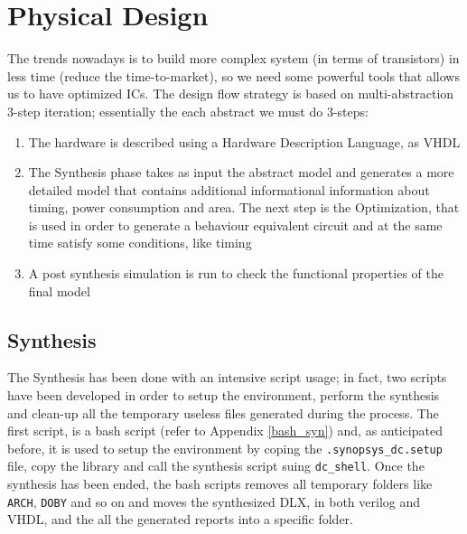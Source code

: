 \chapter{Physical Design}
The trends nowadays is to build more complex system (in terms of transistors) in less time (reduce the time-to-market), so we need some powerful tools that allows us to have optimized ICs. The design flow strategy is based on multi-abstraction 3-step iteration; essentially the each
abstract we must do 3-steps:
\begin{enumerate}
	\item The hardware is described using a Hardware Description Language, as VHDL
	\item The Synthesis phase takes as input the abstract model and generates a more detailed model that contains additional informational information about timing, power consumption and area. The next step is the Optimization, that is used in order to generate a behaviour equivalent circuit and at the same time satisfy some conditions, like timing
	\item A post synthesis simulation is run to check the functional properties of the final model
\end{enumerate}
\section{Synthesis}
\label{sec:syn_opt}
The Synthesis has been done with an intensive script usage; in fact, two scripts have been developed in order to setup the environment, perform the synthesis and clean-up all the temporary useless files generated during the process.\newline\newline
The first script, is a bash script (refer to Appendix \ref{bash_syn}) and, as anticipated before, it is used to setup the environment by coping the \texttt{.synopsys\_dc.setup} file, copy the library and call the synthesis script suing \texttt{dc\_shell}.
Once the synthesis has been ended, the bash scripts removes all temporary folders like \texttt{ARCH}, \texttt{DOBY} and so on and moves the synthesized DLX, in both verilog and VHDL, and the all the generated reports into a specific folder.\newline\newline

